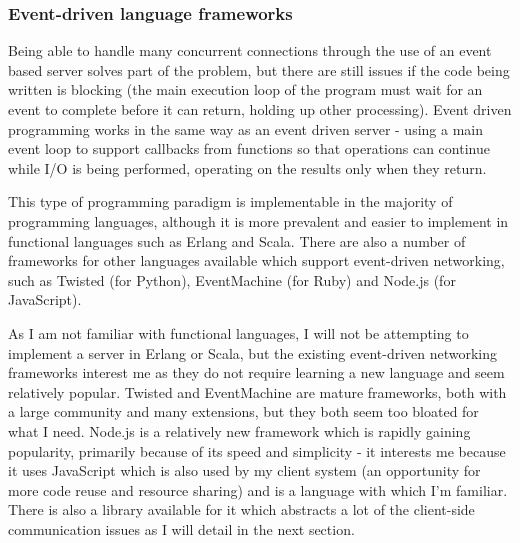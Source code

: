 \documentclass[a4papert,11pt,notitlepage]{ltxdoc}
\begin{document}
\subsubsection{Event-driven language frameworks}
Being able to handle many concurrent connections through the use of an event based server solves part of the problem, but there are still issues if the code being written is blocking (the main execution loop of the program must wait for an event to complete before it can return, holding up other processing). Event driven programming works in the same way as an event driven server - using a main event loop to support callbacks from functions so that operations can continue while I/O is being performed, operating on the results only when they return.

This type of programming paradigm is implementable in the majority of programming languages, although it is more prevalent and easier to implement in functional languages such as Erlang and Scala. There are also a number of frameworks for other languages available which support event-driven networking, such as Twisted (for Python), EventMachine (for Ruby) and Node.js (for JavaScript). 

As I am not familiar with functional languages, I will not be attempting to implement a server in Erlang or Scala, but the existing event-driven networking frameworks interest me as they do not require learning a new language and seem relatively popular. Twisted and EventMachine are mature frameworks, both with a large community and many extensions, but they both seem too bloated for what I need. Node.js is a relatively new framework which is rapidly gaining popularity, primarily because of its speed and simplicity - it interests me because it uses JavaScript which is also used by my client system (an opportunity for more code reuse and resource sharing) and is a language with which I'm familiar. There is also a library available for it which abstracts a lot of the client-side communication issues as I will detail in the next section.
\end{document}
